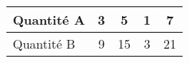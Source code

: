 
\begin{tabular}{|l|c|c|c|c|}
\hline
Quantité A & 3 & 5 & 1 & 7  \\ \hline
Quantité B & 9 & 15 & 3 & 21 \\ \hline
\end{tabular}

